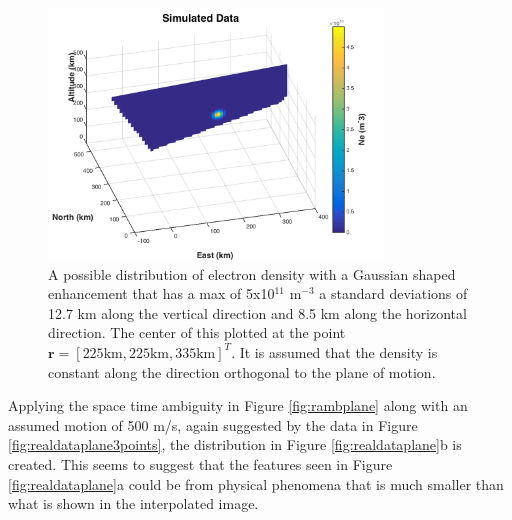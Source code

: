 \begin{figure}[h!]
	\centering
	\includegraphics[width=3.5in]{simdataplaneorig}
	\caption{A possible distribution of electron density with a Gaussian shaped enhancement that has a max of 5x10$^{11}$ m$^{-3}$  a standard deviations of 12.7 km along the vertical direction and 8.5 km along the horizontal direction. The center of this plotted at the point $\mathbf{r}=[ 225\text{km}, 225 \text{km},335\text{km}]^T$. It is assumed that the density is constant along the direction orthogonal to the plane of motion.}
	\label{fig:simdataplaneorig}
\end{figure}

Applying the space time ambiguity in Figure \ref{fig:rambplane} along with an assumed motion of 500 m/s, again suggested by the data in Figure \ref{fig:realdataplane3points}, the distribution in Figure \ref{fig:realdataplane}b is created. This seems to suggest that the features seen in Figure \ref{fig:realdataplane}a could be from physical phenomena that is much smaller than what is shown in the interpolated image. 


